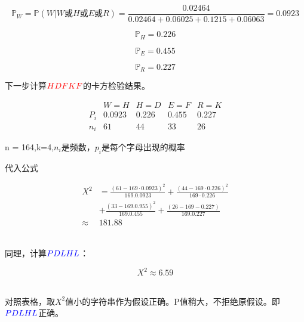 \documentclass{article}
\begin{document}
$$\mathbb{P}_W = \mathbb{P}(W|W\mbox{或}H\mbox{或}E\mbox{或}R)= \frac{0.02464}{0.02464+0.06025+0.1215+0.06063}=0.0923$$


$$\mathbb{P}_H =0.226$$

$$\mathbb{P}_E =0.455$$

$$\mathbb{P}_R =0.227$$

下一步计算\textbf{$\color{red}{HDFKF}$}的卡方检验结果。

$$
\begin{array}{c|c|c|c|c} 
& W=H & H=D & E=F & R=K \\
\hline P_{i} & 0.0923 & 0.226 & 0.455 & 0.227 \\
\hline n_{i} & 61 & 44 & 33 & 26
\end{array}
$$

n = 164,k=4,$n_i$是频数，$p_i$是每个字母出现的概率

代入公式

$$
\begin{aligned}
X^{2} &=\frac{(61-169 \cdot 0.0923)^{2}}{169.0 .0923}+\frac{(44-169 \cdot 0.226)^{2}}{169 \cdot 0.226} \\
&+\frac{(33-169.0 .955)^{2}}{169.0 .455}+\frac{(26-169-0.227)}{169.0 .227} \\
\approx & 181.88
\end{aligned}
$$

~\\

同理，计算\textbf{$\color{blue}{PDLHL}$}：

$$
X^{2} \approx 6.59
$$

~\\

对照表格，取$X^2$值小的字符串作为假设正确。P值稍大，不拒绝原假设。即\textbf{$\color{blue}{PDLHL}$}正确。
\end{document}
